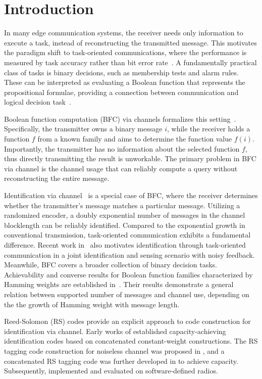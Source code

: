 
\section{Introduction}
\label{sec:introduction}
In many edge communication systems, the receiver needs only information to execute a task, instead of reconstructing the transmitted message. This motivates the paradigm shift to task-oriented communications, where the performance is measured by task accuracy rather than bit error rate~\cite{beyond-bits,task-oriented}. A fundamentally practical class of tasks is binary decisions, such as membership tests and alarm rules. These can be interpreted as evaluating a Boolean function that represents the propositional formulae, providing a connection between communication and logical decision task~\cite{propositional-logic}.

Boolean function computation (BFC) via channels formalizes this setting~\cite{BFC}. Specifically, the transmitter owns a binary message $i$, while the receiver holds a function $f$ from a known family and aims to determine the function value $f(i)$. Importantly, the transmitter has no information about the selected function $f$, thus directly transmitting the result is unworkable. The primary problem in BFC via channel is the channel usage that can reliably compute a query without reconstructing the entire message.

Identification via channel~\cite{ID} is a special case of BFC, where the receiver determines whether the transmitter's message matches a particular message. Utilizing a randomized encoder, a doubly exponential number of messages in the channel blocklength can be reliably identified. Compared to the exponential growth in conventional transmission, task-oriented communication exhibits a fundamental difference. Recent work in~\cite{ID-task} also motivates identification through task-oriented communication in a joint identification and sensing scenario with noisy feedback.
Meanwhile, BFC covers a broader collection of binary decision tasks. Achievability and converse results for Boolean function families characterized by Hamming weights are established in~\cite{BFC-capacity}. Their results demonstrate a general relation between supported number of messages and channel use, depending on the the growth of Hamming weight with message length.

Reed-Solomon (RS) codes provide an explicit approach to code construction for identification via channel. Early works of \cite{CWC} established capacity-achieving identification codes based on concatenated constant-weight constructions. The RS tagging code construction for noiseless channel was proposed in \cite{RS-tagging}, and a concatenated RS tagging code was further developed in \cite{RS-performance} to achieve capacity. Subsequently, \cite{RS-implementation} implemented and evaluated on software-defined radios.

